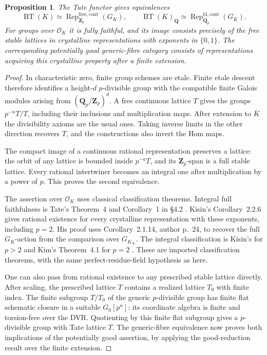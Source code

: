 \documentclass[11pt]{article}
\newtheorem{proposition}[theorem]{Proposition}
\theoremstyle{definition}\newtheorem{definition}[theorem]{Definition}
\theoremstyle{remark}\newtheorem{remark}[theorem]{Remark}
\newcommand{\Q}{\mathbf Q}\newcommand{\Z}{\mathbf Z}
\begin{document}
\begin{proposition}\label{prop:local-categories}
The Tate functor gives equivalences
\[
 \operatorname{BT}(K)\simeq\operatorname{Rep}^{\mathrm{free,cont}}_{\Z_p}(G_K),
 \qquad
 \operatorname{BT}(K)_{\Q}\simeq\operatorname{Rep}^{\mathrm{fd,cont}}_{\Q_p}(G_K).
\]
For groups over $\mathcal O_K$ it is fully faithful, and its image consists precisely of the free stable lattices in crystalline representations with exponents in $\{0,1\}$. The corresponding potentially good generic-fibre category consists of representations acquiring this crystalline property after a finite extension.
\end{proposition}
\begin{proof}
In characteristic zero, finite group schemes are etale. Finite etale descent therefore identifies a height-$d$ $p$-divisible group with the compatible finite Galois modules arising from $(\Q_p/\Z_p)^d$. A free continuous lattice $T$ gives the groups $p^{-n}T/T$, including their inclusions and multiplication maps. After extension to $\overline K$ the divisibility axioms are the usual ones. Taking inverse limits in the other direction recovers $T$, and the constructions also invert the Hom maps.

The compact image of a continuous rational representation preserves a lattice: the orbit of any lattice is bounded inside $p^{-a}T$, and its $\Z_p$-span is a full stable lattice. Every rational intertwiner becomes an integral one after multiplication by a power of $p$. This proves the second equivalence.

The assertion over $\mathcal O_K$ uses classical classification theorems. Integral full faithfulness is Tate's Theorem~4 and Corollary~1 in \S4.2 \cite[pp.~180--181]{TateLocal}. Kisin's Corollary~2.2.6 \cite[author p.~26]{KisinLocal} gives rational existence for every crystalline representation with these exponents, including $p=2$. His proof uses Corollary~2.1.14, author p.~24, to recover the full $G_K$-action from the comparison over $G_{K_\infty}$. The integral classification is Kisin's for $p>2$ and Kim's Theorem~4.1 for $p=2$ \cite[pp.~4--5, 10]{KimLocal}. These are imported classification theorems, with the same perfect-residue-field hypothesis as here.

One can also pass from rational existence to any prescribed stable lattice directly. After scaling, the prescribed lattice $T$ contains a realized lattice $T_0$ with finite index. The finite subgroup $T/T_0$ of the generic $p$-divisible group has finite flat schematic closure in a suitable $G_0[p^n]$: its coordinate algebra is finite and torsion-free over the DVR. Quotienting by this finite flat subgroup gives a $p$-divisible group with Tate lattice $T$. The generic-fibre equivalence now proves both implications of the potentially good assertion, by applying the good-reduction result over the finite extension.
\end{proof}
\end{document}
